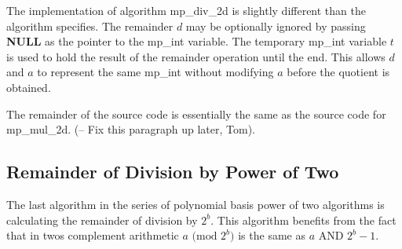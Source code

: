 \documentclass[b5paper]{book}
\begin{document}
The implementation of algorithm mp\_div\_2d is slightly different than the algorithm specifies.  The remainder $d$ may be optionally 
ignored by passing \textbf{NULL} as the pointer to the mp\_int variable.    The temporary mp\_int variable $t$ is used to hold the 
result of the remainder operation until the end.  This allows $d$ and $a$ to represent the same mp\_int without modifying $a$ before
the quotient is obtained.

The remainder of the source code is essentially the same as the source code for mp\_mul\_2d.  (-- Fix this paragraph up later, Tom).

\subsection{Remainder of Division by Power of Two}

The last algorithm in the series of polynomial basis power of two algorithms is calculating the remainder of division by $2^b$.  This
algorithm benefits from the fact that in twos complement arithmetic $a \mbox{ (mod }2^b\mbox{)}$ is the same as $a$ AND $2^b - 1$.  
\end{document}
